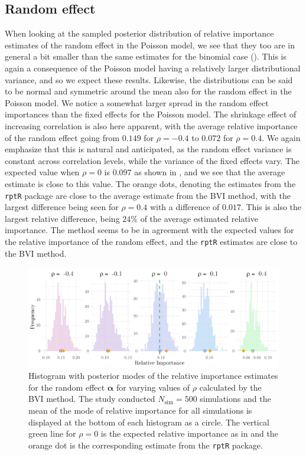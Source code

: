 \subsection{Random effect}
When looking at the sampled posterior distribution of relative importance estimates of the random effect in the Poisson model, we see that they too are in general a bit smaller than the same estimates for the binomial case (). This is again a consequence of the Poisson model having a relatively larger distributional variance, and so we expect these results. Likewise, the distributions can be said to be normal and symmetric around the mean also for the random effect in the Poisson model. We notice a somewhat larger spread in the random effect importances than the fixed effects for the Poisson model. The shrinkage effect of increasing correlation is also here apparent, with the average relative importance of the random effect going from $0.149$ for $\rho=-0.4$ to $0.072$ for $\rho=0.4$. We again emphasize that this is natural and anticipated, as the random effect variance is constant across correlation levels, while the variance of the fixed effects vary. The expected value when $\rho=0$ is $0.097$ as shown in , and we see that the average estimate is close to this value. The orange dots, denoting the estimates from the \texttt{rptR} package are close to the average estimate from the BVI method, with the largest difference being seen for $\rho=0.4$ with a difference of $0.017$. This is also the largest relative difference, being $24\%$ of the average estimated relative importance. The method seems to be in agreement with the expected values for the relative importance of the random effect, and the \texttt{rptR} estimates are close to the BVI method.
\begin{figure}[H]
  \centering
    \includegraphics[width=1\linewidth]{Figures/Simulation study/Random_poisson.png}
    \caption[Relative importance of the random effect $\boldsymbol{\alpha}$ in Poisson GLMM]{Histogram with posterior modes of the relative importance estimates for the random effect $\boldsymbol{\alpha}$ for varying values of $\rho$ calculated by the BVI method. The study conducted $N_{\text{sim}}=500$ simulations and the mean of the mode of relative importance for all simulations is displayed at the bottom of each histogram as a circle. The vertical green line for $\rho=0$ is the expected relative importance as in  and the orange dot is the corresponding estimate from the \texttt{rptR} package.}
    \label{fig:relimp_random_poisson}
\end{figure}
